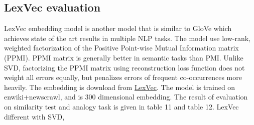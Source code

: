\documentclass[a4paper, 11pt]{article}
\begin{document}
\subsection{LexVec evaluation}
LexVec embedding model is another model that is similar to GloVe which achieves state of the art results in multiple NLP tasks. The model use low-rank, weighted factorization of the Positive Point-wise Mutual Information matrix (PPMI). PPMI matrix is generally better in semantic tasks than PMI. Unlike SVD, factorizing the PPMI matrix using reconstruction loss function does not weight all errors equally, but penalizes errors of frequent co-occurrences more heavily. The embedding is download from \href{https://github.com/alexandres/lexvec}{LexVec}. The model is trained on enwiki+newscrawl, and is 300 dimensional embedding. The result of evaluation on similarity test and analogy task is given in table 11 and table 12.  LexVec different with SVD, 
\begin{table}[ht!]
\centering
{}
\caption{Similarity result of LexVec}
\label{tab:my-table}
\end{table}
\begin{table}[ht!]
\centering
{}
\caption{Analogy tasks on LexVec }
\label{tab:my-table}
\end{table}
\end{document}
